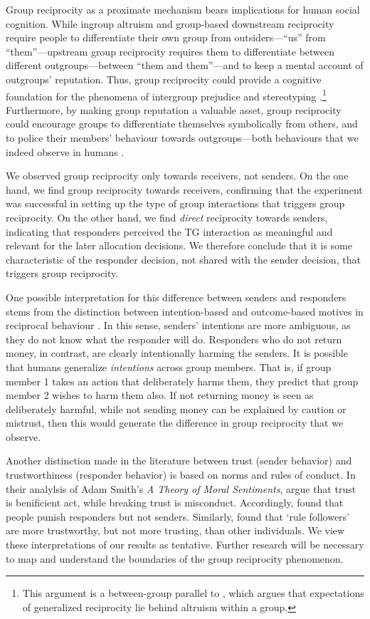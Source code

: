 \documentclass[12pt,a4paper]{article}\usepackage[]{graphicx}\usepackage[]{color}
\begin{document}
Group reciprocity as a proximate mechanism bears implications for human social cognition. While ingroup
altruism and group-based downstream reciprocity require people to differentiate their own group from
outsiders---``us'' from ``them''---upstream group reciprocity requires them to differentiate between
different outgroups---between ``them and them''---and to keep a mental account of outgroups'
reputation. Thus, group reciprocity could provide a cognitive foundation for the phenomena of
intergroup prejudice and stereotyping \citep{allport1954nature}.\footnote{This argument is a
between-group parallel to \citet{yamagishi2000thegroup}, which argues that expectations of
generalized reciprocity lie behind altruism within a group.} Furthermore, by making group reputation
a valuable asset, group reciprocity could encourage groups to differentiate themselves symbolically
from others, and to police their members' behaviour towards outgroups---both behaviours that we indeed observe in humans \citep{fearon1996explaining}.

We observed group reciprocity only towards receivers, not senders.
On the one hand, we find group reciprocity towards receivers, confirming that the experiment was successful in setting up the type of group interactions that triggers group reciprocity. On the other hand, we find \emph{direct} reciprocity towards senders, indicating that responders perceived the TG interaction as meaningful and relevant for the later allocation decisions. We therefore conclude that it is some characteristic of the responder decision, not shared with the sender decision, that triggers group reciprocity.

One possible interpretation for this difference between senders and responders stems from the distinction between intention-based and outcome-based motives in reciprocal behaviour \citep{falk2006theory,stanca2009testing}. In this sense, senders' intentions are more ambiguous, as they do not know what the responder will do. Responders who do not return money, in contrast, are clearly intentionally harming the senders.
It is possible that humans generalize \emph{intentions} across group members. That is, if group member 1 takes an action that deliberately harms them, they predict that group member 2 wishes to harm them also. If not returning money is seen as deliberately harmful, while
not sending money can be explained by caution or mistrust, then this would generate the difference in group reciprocity that we observe.

Another distinction made in the literature between trust (sender behavior) and trustworthiness (responder behavior) is based on norms and rules of conduct. In their analylsis of Adam Smith's \emph{A Theory of Moral Sentiments}, \citet{wilson2017sentiments} argue that trust is benificient act, while breaking trust is misconduct. Accordingly, \citet{wilson2017sentiments} found that people punish responders but not senders. Similarly, \citet{kimbrough2015norms} found that `rule followers' are more trustworthy, but not more trusting, than other individuals.
We view these interpretations of our results as tentative. Further research will be necessary to map and understand the boundaries of the group reciprocity phenomenon.
\end{document}
